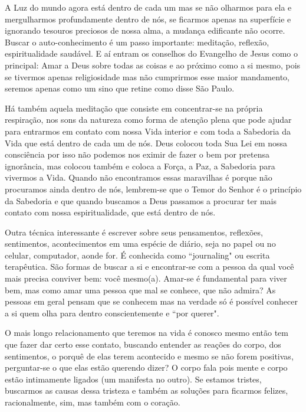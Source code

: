 \emdash{}A Luz do mundo agora está dentro de cada um mas se não olharmos para ela e mergulharmos profundamente dentro de nós, se ficarmos apenas na superfície e ignorando tesouros preciosos de nossa alma, a mudança edificante não ocorre. Buscar o auto-conhecimento é um passo importante: meditação, reflexão, espiritualidade saudável. E aí entram os conselhos do Evangelho de Jesus como o principal: Amar a Deus sobre todas as coisas e ao próximo como a si mesmo, pois se tivermos apenas religiosidade mas não cumprirmos esse maior mandamento, seremos apenas como um sino que retine como disse São Paulo.

\emdash{}Há também aquela meditação que consiste em concentrar-se na própria respiração, nos sons da natureza como forma de atenção plena que pode ajudar para entrarmos em contato com nossa Vida interior e com toda a Sabedoria da Vida que está dentro de cada um de nós. Deus colocou toda Sua Lei em nossa consciência por isso não podemos nos eximir de fazer o bem por pretensa ignorância, mas colocou também e coloca a Força, a Paz, a Sabedoria para vivermos a Vida. Quando não encontramos essas maravilhas é porque não procuramos ainda dentro de nós, lembrem-se que o Temor do Senhor é o princípio da Sabedoria e que quando buscamos a Deus passamos a procurar ter mais contato com nossa espiritualidade, que está dentro de nós.

\emdash{}Outra técnica interessante é escrever sobre seus pensamentos, reflexões, sentimentos, acontecimentos em uma espécie de diário, seja no papel ou no celular, computador, aonde for. É conhecida como ``journaling" ou escrita terapêutica. São formas de buscar a si e encontrar-se  com a pessoa da qual você mais precisa conviver bem: você mesmo(a). Amar-se é fundamental para viver bem, mas como amar uma pessoa que mal se conhece, que não admira? As pessoas em geral pensam que se conhecem mas na verdade só é possível conhecer a si quem olha para dentro conscientemente e ``por querer".

\emdash{}O mais longo relacionamento que teremos na vida é conosco mesmo então tem que fazer dar certo esse contato, buscando entender as reações do corpo, dos sentimentos, o porquê de elas terem acontecido e mesmo se não forem positivas, perguntar-se o que elas estão querendo dizer? O corpo fala pois mente e corpo estão intimamente ligados (um manifesta no outro). Se estamos tristes, buscarmos as causas dessa tristeza e também as soluções para ficarmos felizes, racionalmente, sim, mas também com o coração.

